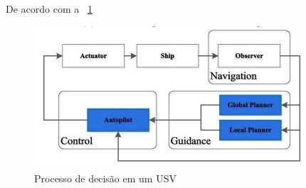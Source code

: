 De acordo com a ~\ref{fig:decision_process}

\begin{figure}
    \centering
    \includegraphics{fig/decision_process.png}
    \caption{Processo de decisão em um USV ~\cite{HUANG2020451}}
    \label{fig:decision_process}
\end{figure}

\subsection{}